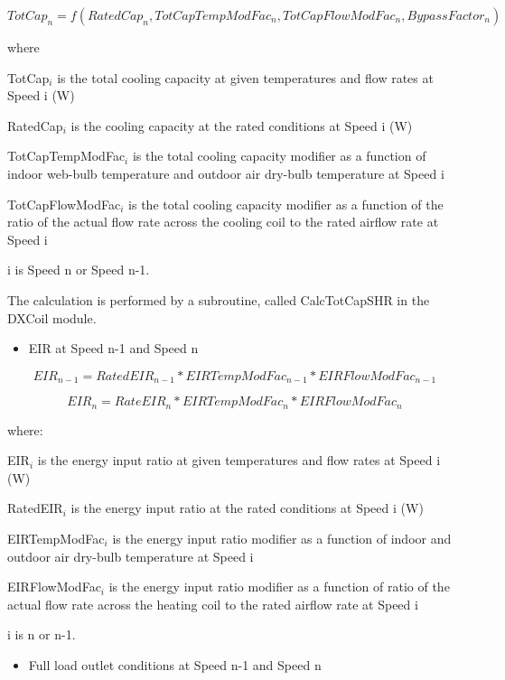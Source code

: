 \begin{equation}
 TotCa{p_n} = f(RatedCa{p_n},TotCapTempModFa{c_n},TotCapFlowModFa{c_n},BypassFacto{r_n})
\end{equation}

where

TotCap\(_{i}\) is the total cooling capacity at given temperatures and flow rates at Speed i (W)

RatedCap\(_{i}\) is the cooling capacity at the rated conditions at Speed i (W)

TotCapTempModFac\(_{i}\) is the total cooling capacity modifier as a function of indoor web-bulb temperature and outdoor air dry-bulb temperature at Speed i

TotCapFlowModFac\(_{i}\) is the total cooling capacity modifier as a function of the ratio of the actual flow rate across the cooling coil to the rated airflow rate at Speed i

i is Speed n or Speed n-1.

The calculation is performed by a subroutine, called CalcTotCapSHR in the DXCoil module.

\begin{itemize}
  \item EIR at Speed n-1 and Speed n
\end{itemize}

\begin{equation}
EI{R_{n - 1}} = RatedEI{R_{n - 1}}*EIRTempModFa{c_{n - 1}}*EIRFlowModFa{c_{n - 1}}
\end{equation}

\begin{equation}
EI{R_n} = RateEI{R_n}*EIRTempModFa{c_n}*EIRFlowModFa{c_n}
\end{equation}

where:

EIR\(_{i}\) is the energy input ratio at given temperatures and flow rates at Speed i (W)

RatedEIR\(_{i}\) is the energy input ratio at the rated conditions at Speed i (W)

EIRTempModFac\(_{i}\) is the energy input ratio modifier as a function of indoor and outdoor air dry-bulb temperature at Speed i

EIRFlowModFac\(_{i}\) is the energy input ratio modifier as a function of ratio of the actual flow rate across the heating coil to the rated airflow rate at Speed i

i is n or n-1.

\begin{itemize}
  \item Full load outlet conditions at Speed n-1 and Speed n
\end{itemize}

